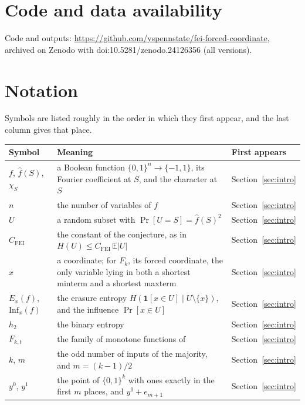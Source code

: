\documentclass[11pt]{amsart}
\theoremstyle{remark}
\newcommand{\Inf}{\mathrm{Inf}}
\newcommand{\E}{\mathbb{E}}
\begin{document}
\section*{Code and data availability}
Code and outputs: \url{https://github.com/yspennstate/fei-forced-coordinate}, archived on Zenodo with doi:10.5281/zenodo.24126356 (all versions).

\appendix
\section{Notation}\label{app:notation}

Symbols are listed roughly in the order in which they first appear, and the last column gives that place.

\begin{longtable}{@{}>{\raggedright\arraybackslash}p{}>{\raggedright\arraybackslash}p{}>{\raggedright\arraybackslash}p{}@{}}
\toprule
Symbol & Meaning & First appears \\
\midrule
\endhead
$f$, $\hat f(S)$, $\chi_S$ & a Boolean function $\{0,1\}^n\to\{-1,1\}$, its Fourier coefficient at $S$, and the character at $S$ & Section~\ref{sec:intro} \\
$n$ & the number of variables of $f$ & Section~\ref{sec:intro} \\
$U$ & a random subset with $\Pr[U=S]=\hat f(S)^2$ & Section~\ref{sec:intro} \\
$C_{\mathrm{FEI}}$ & the constant of the conjecture, as in $H(U)\le C_{\mathrm{FEI}}\,\E|U|$ & Section~\ref{sec:intro} \\
$x$ & a coordinate; for $F_k$, its forced coordinate, the only variable lying in both a shortest minterm and a shortest maxterm & Section~\ref{sec:intro} \\
$E_x(f)$, $\Inf_x(f)$ & the erasure entropy $H(\mathbf 1[x\in U]\mid U\setminus\{x\})$, and the influence $\Pr[x\in U]$ & Section~\ref{sec:intro} \\
$h_2$ & the binary entropy & Section~\ref{sec:intro} \\
$F_{k,t}$ & the family of monotone functions of~\cite[Section~5]{Shm8} & Section~\ref{sec:intro} \\
$k$, $m$ & the odd number of inputs of the majority, and $m=(k-1)/2$ & Section~\ref{sec:intro} \\
$y^0$, $y^1$ & the point of $\{0,1\}^k$ with ones exactly in the first $m$ places, and $y^0+e_{m+1}$ & Section~\ref{sec:intro} \\

\end{longtable}
\end{document}

